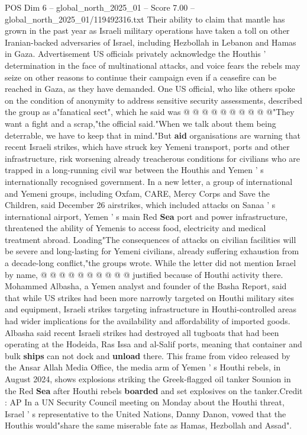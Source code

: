 \begin{textsample}{POS Dim 6 – global\_north\_2025\_01 – Score 7.00 – global\_north\_2025\_01/119492316.txt}
Their ability to claim that mantle has grown in the past year as Israeli military operations have taken a toll on other Iranian-backed adversaries of Israel, including Hezbollah in Lebanon and Hamas in Gaza.
Advertisement US officials privately acknowledge the Houthis ' determination in the face of multinational attacks, and voice fears the rebels may seize on other reasons to continue their campaign even if a ceasefire can be reached in Gaza, as they have demanded.
One US official, who like others spoke on the condition of anonymity to address sensitive security assessments, described the group as a"fanatical sect", which he said was @ @ @ @ @ @ @ @ @ @"They want a fight and a scrap,"the official said."When we talk about them being deterrable, we have to keep that in mind."But \textbf{aid} organisations are warning that recent Israeli strikes, which have struck key Yemeni transport, ports and other infrastructure, risk worsening already treacherous conditions for civilians who are trapped in a long-running civil war between the Houthis and Yemen ' s internationally recognised government.
In a new letter, a group of international and Yemeni groups, including Oxfam, CARE, Mercy Corps and Save the Children, said December 26 airstrikes, which included attacks on Sanaa ' s international airport, Yemen ' s main Red \textbf{Sea} port and power infrastructure, threatened the ability of Yemenis to access food, electricity and medical treatment abroad.
Loading"The consequences of attacks on civilian facilities will be severe and long-lasting for Yemeni civilians, already suffering exhaustion from a decade-long conflict,"the groups wrote.
While the letter did not mention Israel by name, @ @ @ @ @ @ @ @ @ @ justified because of Houthi activity there.
Mohammed Albasha, a Yemen analyst and founder of the Basha Report, said that while US strikes had been more narrowly targeted on Houthi military sites and equipment, Israeli strikes targeting infrastructure in Houthi-controlled areas had wider implications for the availability and affordability of imported goods.
Albasha said recent Israeli strikes had destroyed all tugboats that had been operating at the Hodeida, Ras Issa and al-Salif ports, meaning that container and bulk \textbf{ships} can not dock and \textbf{unload} there.
This frame from video released by the Ansar Allah Media Office, the media arm of Yemen ' s Houthi rebels, in August 2024, shows explosions striking the Greek-flagged oil tanker Sounion in the Red \textbf{Sea} after Houthi rebels \textbf{boarded} and set explosives on the tanker.Credit : AP In a UN Security Council meeting on Monday about the Houthi threat, Israel ' s representative to the United Nations, Danny Danon, vowed that the Houthis would"share the same miserable fate as Hamas, Hezbollah and Assad".

\end{textsample}

